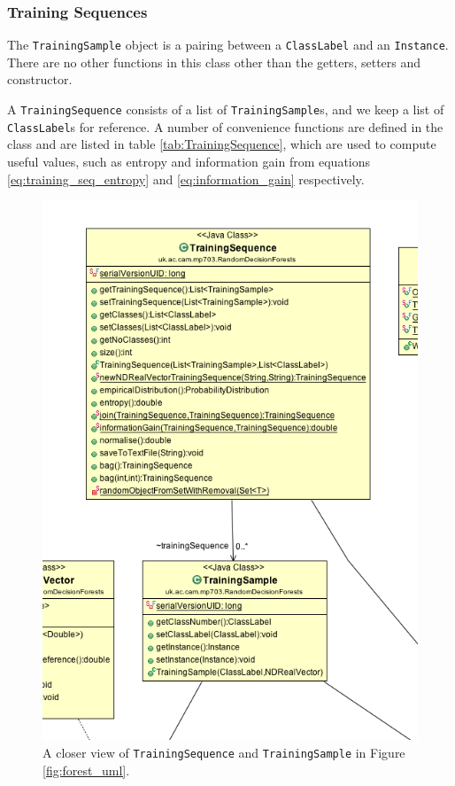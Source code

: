 \documentclass[12pt,twoside,notitlepage]{report}
\begin{document}
            \subsubsection{Training Sequences}
                The \texttt{TrainingSample} object is a pairing between a \texttt{ClassLabel} and an 
                \texttt{Instance}. There are no other functions in this class other than the getters, setters and 
                constructor. 

                A \texttt{TrainingSequence} consists of a list of \texttt{TrainingSample}s, and we keep a list of 
                \texttt{ClassLabel}s for reference. A number of convenience functions are defined in the class and 
                are listed in table \ref{tab:TrainingSequence}, which are used to compute useful values, such as
                entropy and information gain from equations \ref{eq:training_seq_entropy} and \ref{eq:information_gain} 
                respectively.

                \begin{figure}[H]
                    \centering
                    \includegraphics[scale=0.5]{TrainingSequence_Forest_UML}
                    \caption{A closer view of \texttt{TrainingSequence} and \texttt{TrainingSample} in Figure \ref{fig:forest_uml}.}
                    \label{fig:training_seq_uml}
                \end{figure}
\end{document}
